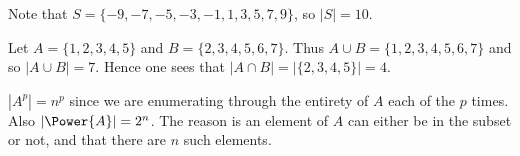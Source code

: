 \begin{questions}
    \item \begin{partquestions}{\alph*}
        \item Note that $S = \{-9, -7, -5, -3, -1, 1, 3, 5, 7, 9\}$, so $|S| = 10$.
        \item Let $A = \{1, 2, 3, 4, 5\}$ and $B = \{2, 3, 4, 5, 6, 7\}$. Thus $A \cup B = \{1, 2, 3, 4, 5, 6, 7\}$ and so $|A \cup B| = 7$. Hence one sees that $|A \cap B| = |\{2, 3, 4, 5\}| = 4$.
        \item $|A^p| = n^p$ since we are enumerating through the entirety of $A$ each of the $p$ times. Also $|\Power{A}| = 2^n$. The reason is an element of $A$ can either be in the subset or not, and that there are $n$ such elements.
    \end{partquestions}
\end{questions}
